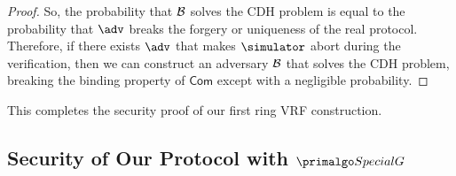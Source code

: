 \begin{proof}
	So, the probability that $ \mathcal{B} $ solves the CDH problem is equal to the probability that $ \adv $ breaks the forgery or uniqueness of the real protocol. Therefore,  if there exists $ \adv $ that makes $ \simulator$ abort during the verification, then we can construct an adversary $ \mathcal{B} $ that solves the CDH problem, breaking the binding property of $ \mathsf{Com} $ except with a negligible probability.
	
	
	
\end{proof}
This completes the security proof of our first ring VRF construction.\eprint{ \qed}{\qed}



\subsection{Security of Our Protocol with $ \SpecialG $}
\label{ap:secondprotocolproof}
%


